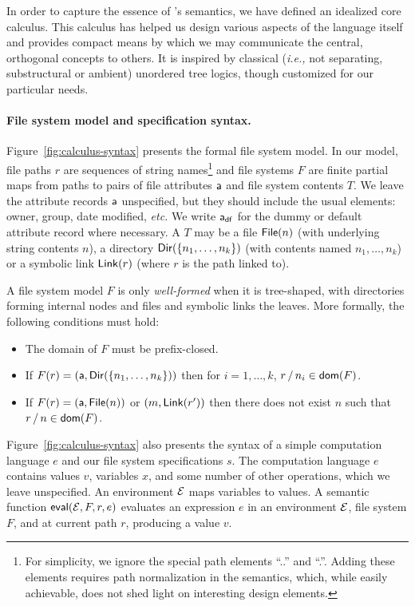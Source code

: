 \documentclass[nocopyrightspace,natbib]{sigplanconf}
\begin{document}
In order to capture the essence of \forest{}'s semantics, we have
defined an idealized core calculus.  This calculus has helped us
design various aspects of the \forest{} language itself and provides
compact means by which we may communicate the central, orthogonal
concepts to others.  It is inspired by classical ({\em i.e.,} not
separating, substructural or ambient) unordered tree logics, though
customized for our particular needs.

\paragraph*{File system model and specification syntax.}
Figure~\ref{fig:calculus-syntax} presents the formal file system model.  
In our model, file paths $r$ are
sequences of string names\footnote{For simplicity, we ignore the special path
elements ``..'' and ``.''.  Adding these elements
requires path normalization in the semantics, which, while easily
achievable, does not shed light on interesting design elements.} 
and file systems $F$
are finite partial maps from paths to pairs of file attributes $\mathsf{a}$
and file system contents $T$.  We leave the attribute records $\mathsf{a}$ 
unspecified, but they should include the usual elements: owner, group,
date modified, {\it etc.}  We write $\mathsf{a}_{\mathsf{df}}$ for the dummy or
default attribute record where necessary.
A $T$ may be a file $\mathsf{File}(n)$ (with underlying string contents $n$),
a directory $\mathsf{Dir}( \{ n_1,\dots,n_k \} )$ (with contents named 
$n_1, \ldots, n_k$) or a symbolic link $\mathsf{Link}(r)$ (where $r$ is the
path linked to).  

A file system model $F$ is only {\em well-formed} when it is tree-shaped,
with directories forming internal nodes and files and symbolic
links the leaves.  More formally, the following conditions must hold:
\begin{itemize}
\item The domain of $F$ must be prefix-closed.
\item If $F(r) = (\mathsf{a},\mathsf{Dir}( \{ n_1,\dots,n_k \} ))$ then for $i=1,\ldots,k$,
$r\,\textsf{/}\,n_i \in \mathsf{dom}(F)$.
\item  If $F(r) = (\mathsf{a},\mathsf{File}(n))$ or $(m,\mathsf{Link}(r'))$ then 
there does not exist $n$ such that $r\,\textsf{/}\,n \in \mathsf{dom}(F)$.
\end{itemize}

Figure~\ref{fig:calculus-syntax} also presents the syntax of
a simple computation language $e$ and our
file system specifications $s$.  The computation language $e$
contains values $v$, variables $x$, and some number of other
operations, which we leave unspecified.  An environment
$\mathcal{E}$ maps variables to values.  A semantic function
$\mathsf{eval}(\mathcal{E},F,r,e)$ evaluates an expression $e$ in an
environment $\mathcal{E}$, file system $F$, and at current path $r$,
producing a value $v$.
\end{document}
